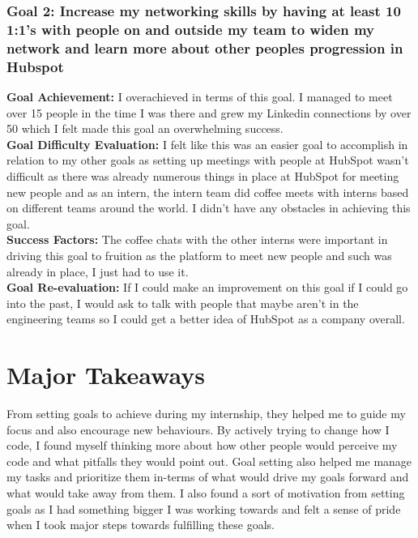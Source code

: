 \subsubsection*{Goal 2: Increase my networking skills by having at least 10 1:1’s with people on and outside my team to widen my network and learn more about other peoples progression in Hubspot}
\textbf{Goal Achievement: } I overachieved in terms of this goal.  I managed to meet over 15 people in the time I was there and grew my Linkedin connections by over 50 which I felt made this goal an overwhelming success.  \\
\textbf{Goal Difficulty Evaluation:} I felt like this was an easier goal to accomplish in relation to my other goals as setting up meetings with people at HubSpot wasn't difficult as there was already numerous things in place at HubSpot for meeting new people and as an intern,  the intern team did coffee meets with interns based on different teams around the world.  I didn't have  any obstacles in achieving this goal.  \\  
\textbf{Success Factors:} The coffee chats with the other interns were important in driving this goal to fruition as the platform to meet new people and such was already in place,  I just had to use it. \\
\textbf{Goal Re-evaluation:} If I could make an improvement on this goal if I could go into the past,  I would ask to talk with people that maybe aren't in the engineering teams so I could get a better idea of HubSpot as a company overall. 

\section{Major Takeaways}
From setting goals to achieve during my internship,  they helped me to guide my focus and also encourage new behaviours.  By actively trying to change how I code,  I found myself thinking more about how other people would perceive my code and what pitfalls they would point out.  Goal setting also helped me manage my tasks and prioritize them in-terms of what would drive my goals forward and what would take away from them.  I also found a sort of motivation from setting goals as I had something bigger I was working towards and felt a sense of pride when I took major steps towards fulfilling these goals.
